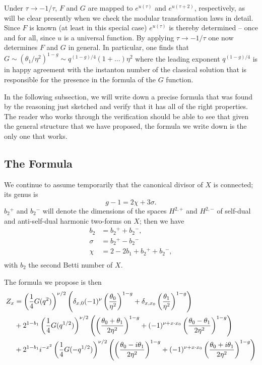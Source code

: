 \documentclass[12pt]{article}
\numberwithin{equation}{section}
\begin{document}
Under $\tau\to -1/\tau$, $F$ and $G$ are mapped to $e^{u({\tau})}$ and
$e^{u(\tau+2)}$, respectively, as will be clear presently when we
check the modular transformation laws in detail.
Since $F$ is known (at least in this special case) $e^{u({\tau})}$
is thereby determined -- once and for all, since $u$ is a universal function.
By applying $\tau\to -1/\tau$ one now determines $F$ and $G$ in general.
In particular, one finds that $G\sim (\theta_1/\eta^2)^{1-g}
\sim q^{ (1-g)/4}(1+\dots)\eta^2$ where the leading exponent $q^{ (1-g)/4}$
is in happy agreement with the instanton number of the classical solution
that is responsible for the presence in the formula of the $G$ function.

In the following subsection, we will write down a precise formula
that was found by the reasoning just sketched and verify that it has all of
the right properties.  The reader who works through the verification
should be able to see that given the general structure that we have proposed,
the formula we write down is the only one that works.

\subsection{The Formula}

We continue
to assume temporarily that the canonical divisor of $X$ is connected;
its genus is
\begin{equation}
  \label{ggenus}
  g-1=2\chi+3\sigma.
\end{equation}
$b_2{}^+$ and $b_2{}^-$
will denote the dimensions of the spaces $H^{2,+}$ and $H^{2,-}$ of
self-dual and anti-self-dual harmonic two-forms on $X$; then we have
\begin{equation}
  \label{trufu}
  \begin{aligned}b_2&=b_2{}^++b_2{}^-,\\
    \sigma& =b_2{}^+-b_2{}^-\\
    \chi&=2-2b_1+b_2{}^++b_2{}^-,\\
  \end{aligned}
\end{equation}
with $b_2$ the second Betti number of $X$.

The formula we propose is then
\begin{equation}
  \label{imcin}
  \begin{aligned}Z_x & = \left({1\over 4}G(q^2)\right)
    ^{\nu/2}\left(\delta_{x,0}(-1)^\nu\left({\theta_0\over\eta^2}\right)^{1-g}
    +\delta_{x,x_0}\left({\theta_1\over \eta^2}\right)^{1-g}\right)
    \\ &+2^{1-b_1}\left({1\over 4}G(q^{1/2})\right)^{\nu/2}\left(
      \left({\theta_0+\theta_1\over 2\eta^2}\right)^{1-g}
      +(-1)^{\nu+x\cdot x_0} \left({\theta_0-\theta_1\over
    2\eta^2}\right)^{1-g}\right)\\ &+2^{1-b_1}i^{-x^2}\left({1\over
    4}G(-q^{1/2})\right)^{\nu/2}\left(\left( {\theta_0-i\theta_1\over
      2\eta^2}\right)^{1-g} +(-1)^{\nu+x\cdot x_0}
    \left({\theta_0+i\theta_1\over 2\eta^2}\right)^{1-g}\right)\\
  \end{aligned}
\end{equation}
\end{document}
